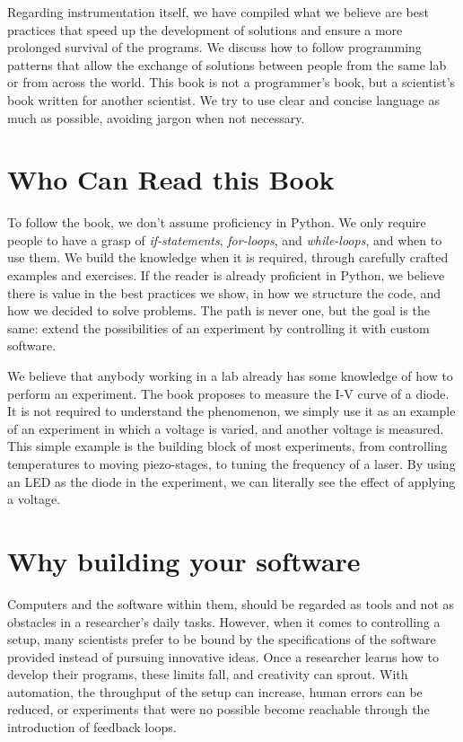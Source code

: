 Regarding instrumentation itself, we have compiled what we believe are best practices that speed up the development of solutions and ensure a more prolonged survival of the programs. We discuss how to follow programming patterns that allow the exchange of solutions between people from the same lab or from across the world. This book is not a programmer's book, but a scientist's book written for another scientist. We try to use clear and concise language as much as possible, avoiding jargon when not necessary.

\section{Who Can Read this Book}
To follow the book, we don't assume proficiency in Python. We only require people to have a grasp of \textit{if-statements}, \textit{for-loops}, and \textit{while-loops}, and when to use them. We build the knowledge when it is required, through carefully crafted examples and exercises. If the reader is already proficient in Python, we believe there is value in the best practices we show, in how we structure the code, and how we decided to solve problems. The path is never one, but the goal is the same: extend the possibilities of an experiment by controlling it with custom software.

We believe that anybody working in a lab already has some knowledge of how to perform an experiment. The book proposes to measure the I-V curve of a diode. It is not required to understand the phenomenon, we simply use it as an example of an experiment in which a voltage is varied, and another voltage is measured. This simple example is the building block of most experiments, from controlling temperatures to moving piezo-stages, to tuning the frequency of a laser. By using an LED as the diode in the experiment, we can literally see the effect of applying a voltage.

\section{Why building your software}
Computers and the software within them, should be regarded as tools and not as obstacles in a researcher's daily tasks. However, when it comes to controlling a setup, many scientists prefer to be bound by the specifications of the software provided instead of pursuing innovative ideas. Once a researcher learns how to develop their programs, these limits fall, and creativity can sprout. With automation, the throughput of the setup can increase, human errors can be reduced, or experiments that were no possible become reachable through the introduction of feedback loops.

